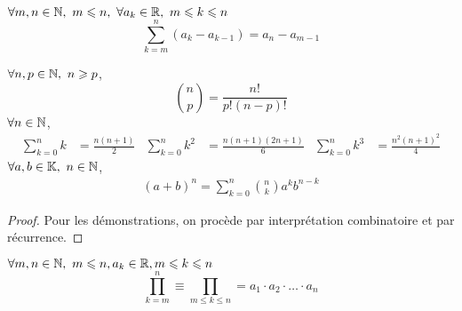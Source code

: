 \begin{proposition}
    $\forall m, n \in \mathbb{N},\ m \leqslant n,\ \forall a_k \in \mathbb{R},\ m \leqslant k \leqslant n$
    \[ \sum_{k = m}^n (a_k - a_{k - 1}) = a_n - a_{m - 1} \]
\end{proposition}

\begin{proposition}
	$\forall n, p \in \mathbb{N},\ n \geqslant p$,
	\[ \binom{n}{p} = \frac{n!}{p!(n - p)!} \]
	$\forall n \in \mathbb{N}$,
	\begin{align*}
		\sum_{k = 0}^{n} k &= \frac{n(n+1)}{2} & 
		\sum_{k = 0}^{n} k^2 &= \frac{n(n+1)(2n+1)}{6} &
		\sum_{k = 0}^{n} k^3 &= \frac{n^2(n+1)^2}{4}
	\end{align*}
	$\forall a, b \in \mathbb{K},\ n \in \mathbb{N}$,
	\begin{align*}
		(a + b)^n = \sum_{k = 0}^{n} \binom{n}{k} a^kb^{n-k}
	\end{align*}
\end{proposition}
\begin{proof}
    Pour les démonstrations, on procède par interprétation combinatoire et par récurrence.
\end{proof}

\begin{definition}[Produit]
    $\forall m, n \in \mathbb{N},\ m \leqslant n, a_k \in \mathbb{R}, m \leqslant k \leqslant n$
    \[ \prod_{k = m}^{n} \equiv \prod_{m \leq k \leq n} = a_1 \cdot a_2 \cdot \ldots \cdot a_n \]
\end{definition}